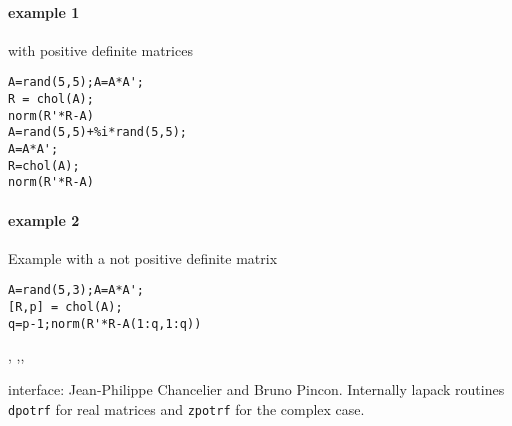 \begin{examples}
\paragraph{example 1} with positive definite matrices 
\begin{Verbatim}
A=rand(5,5);A=A*A';
R = chol(A);
norm(R'*R-A)
A=rand(5,5)+%i*rand(5,5);
A=A*A';
R=chol(A);
norm(R'*R-A)
\end{Verbatim}

\paragraph{example 2} Example with a not positive definite matrix
\begin{Verbatim}
A=rand(5,3);A=A*A';
[R,p] = chol(A);
q=p-1;norm(R'*R-A(1:q,1:q))
\end{Verbatim}
\end{examples}

\begin{manseealso}
  , ,,   
\end{manseealso}

\begin{authors}
   interface: Jean-Philippe Chancelier and Bruno Pincon. Internally lapack routines \verb+dpotrf+ for real matrices 
   and \verb+zpotrf+ for the complex case.
\end{authors}


 
 
  
